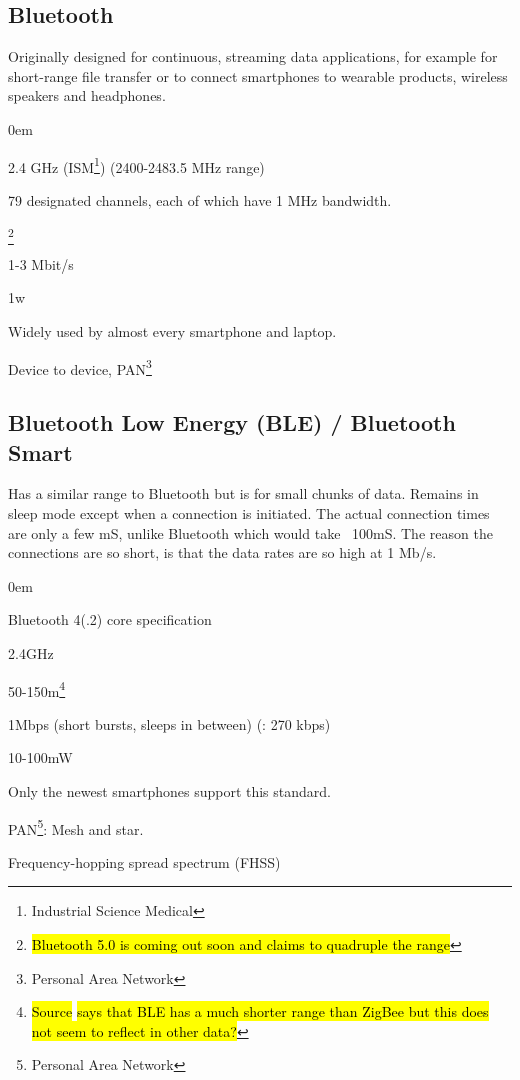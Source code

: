 \documentclass[11pt,a4paper,twoside]{article} %
\begin{document}
\subsection{Bluetooth}
Originally designed for continuous, streaming data applications, for example for short-range file transfer or to connect smartphones to wearable products, wireless speakers and headphones.
\vspace{-0.5cm}
\begin{description}
	\itemsep0em
	\item [Standard]
	\item [Frequency] 2.4 GHz (ISM\footnote{Industrial Science Medical}) (2400-2483.5 MHz range)
	\item [Additional wireless info] 79 designated channels, each of which have 1 MHz bandwidth.
	\item [Range] \footnote{\hl{Bluetooth 5.0 is coming out soon and claims to quadruple the range}}
	\item [Bitrate] 1-3 Mbit/s
	\item [Power Usage] 1w
	\item [Infrastructure] Widely used by almost every smartphone and laptop.
	\item [Network topology] Device to device, PAN\footnote{Personal Area Network}
\end{description}

\clearpage


\subsection{Bluetooth Low Energy (BLE) / Bluetooth Smart}
Has a similar range to Bluetooth but is for small chunks of data. Remains in sleep mode except when a connection is initiated. The actual connection times are only a few mS, unlike Bluetooth which would take ~100mS. The reason the connections are so short, is that the data rates are so high at 1 Mb/s.
\vspace{-0.5cm}
\begin{description}
	\itemsep0em
	\item [Standard] Bluetooth 4(.2) core specification
	\item [Frequency] 2.4GHz
	\item [Range] 50-150m\footnote{\hl{Source} \cite{BTzigbee} \hl{says that BLE has a much shorter range than ZigBee but this does not seem to reflect in other data?}}
	\item [Bitrate] 1Mbps (short bursts, sleeps in between) (\cite{BTzigbee}: 270 kbps)
	\item [Power Usage] 10-100mW
	\item [Infrastructure] Only the newest smartphones support this standard.
	\item [Network topology] PAN\footnote{Personal Area Network}: Mesh and star.
	\item [Modulation] Frequency-hopping spread spectrum (FHSS)
\end{description}
\end{document}
